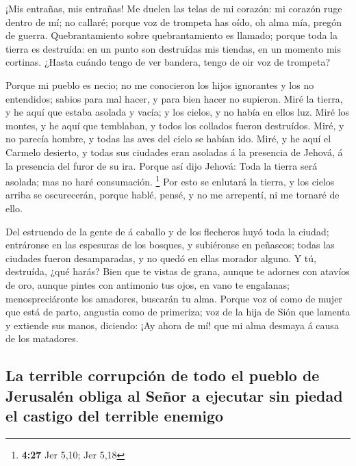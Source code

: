  ¡Mis entrañas, mis entrañas! Me duelen las telas de mi
corazón: mi corazón ruge dentro de mí; no callaré; porque voz de
trompeta has oído, oh alma mía, pregón de guerra. 
Quebrantamiento sobre quebrantamiento es llamado; porque toda la tierra
es destruída: en un punto son destruídas mis tiendas, en un momento mis
cortinas.  ¿Hasta cuándo tengo de ver bandera, tengo de
oir voz de trompeta?

 Porque mi pueblo es necio; no me conocieron los hijos
ignorantes y los no entendidos; sabios para mal hacer, y para bien hacer
no supieron.  Miré la tierra, y he aquí que estaba
asolada y vacía; y los cielos, y no había en ellos luz. 
Miré los montes, y he aquí que temblaban, y todos los collados fueron
destruídos.  Miré, y no parecía hombre, y todas las aves
del cielo se habían ido.  Miré, y he aquí el Carmelo
desierto, y todas sus ciudades eran asoladas á la presencia de Jehová, á
la presencia del furor de su ira.  Porque así dijo
Jehová: Toda la tierra será asolada; mas no haré consumación.
\footnote{\textbf{4:27} Jer 5,10; Jer 5,18}  Por esto se
enlutará la tierra, y los cielos arriba se oscurecerán, porque hablé,
pensé, y no me arrepentí, ni me tornaré de ello.

 Del estruendo de la gente de á caballo y de los
flecheros huyó toda la ciudad; entráronse en las espesuras de los
bosques, y subiéronse en peñascos; todas las ciudades fueron
desamparadas, y no quedó en ellas morador alguno.  Y tú,
destruída, ¿qué harás? Bien que te vistas de grana, aunque te adornes
con atavíos de oro, aunque pintes con antimonio tus ojos, en vano te
engalanas; menospreciáronte los amadores, buscarán tu alma.
 Porque voz oí como de mujer que está de parto, angustia
como de primeriza; voz de la hija de Sión que lamenta y extiende sus
manos, diciendo: ¡Ay ahora de mí! que mi alma desmaya á causa de los
matadores.

\hypertarget{la-terrible-corrupciuxf3n-de-todo-el-pueblo-de-jerusaluxe9n-obliga-al-seuxf1or-a-ejecutar-sin-piedad-el-castigo-del-terrible-enemigo}{%
\subsection{La terrible corrupción de todo el pueblo de Jerusalén obliga
al Señor a ejecutar sin piedad el castigo del terrible
enemigo}\label{la-terrible-corrupciuxf3n-de-todo-el-pueblo-de-jerusaluxe9n-obliga-al-seuxf1or-a-ejecutar-sin-piedad-el-castigo-del-terrible-enemigo}}


